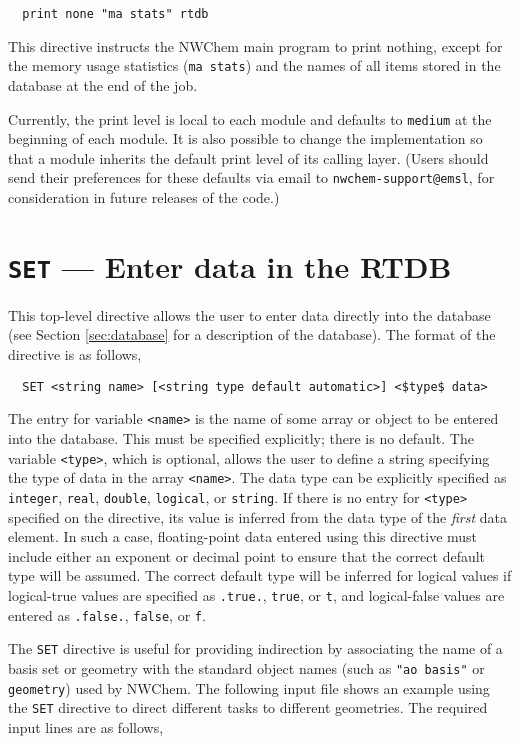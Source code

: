 \begin{verbatim}
  print none "ma stats" rtdb
\end{verbatim}

This directive instructs the NWChem main program to print nothing,
except for the memory usage statistics (\verb+ma stats+) and
the names of all items stored in the database at the end of the job.

Currently, the print level is local to each module and defaults to
{\tt medium} at the beginning of each module.  It is also possible to change
the implementation so that a module inherits the default print level
of its calling layer.  (Users should send their preferences for these
defaults via email to \verb+nwchem-support@emsl+, for consideration in
future releases of the code.)

\section{{\tt SET} --- Enter data in the RTDB}
\label{sec:set}

This top-level directive allows the user to enter data directly into the
database (see Section \ref{sec:database} for a description of the database).
The format of the directive is as follows,

\begin{verbatim}
  SET <string name> [<string type default automatic>] <$type$ data>
\end{verbatim}

The entry for variable \verb+<name>+ is the name of some array or object to be entered
into the database.  This must be specified explicitly; there is no
default.  The variable \verb+<type>+, which is optional, allows the user to define a string
specifying the type of data in the array \verb+<name>+.  The data type
can be explicitly specified as \verb+integer+, \verb+real+,
\verb+double+, \verb+logical+, or \verb+string+.  If there is no entry
for \verb+<type>+ specified on
the directive, its value is inferred from
the data type of the {\em first} data element.  In such a case,
floating-point data entered using this directive must include either
an exponent or decimal point to ensure that the correct default type
will be assumed.  The correct default type will be inferred for
logical values if logical-true values are specified as \verb+.true.+,
\verb+true+, or \verb+t+, and logical-false values are entered as
\verb+.false.+, \verb+false+, or \verb+f+.

The \verb+SET+ directive is useful for providing indirection by
associating the name of a basis set or geometry with the standard
object names (such as \verb+"ao basis"+ or \verb+geometry+) used by
NWChem.  The following input file shows an example using the
\verb+SET+ directive to direct different tasks to different
geometries.  The required input lines are as follows,

